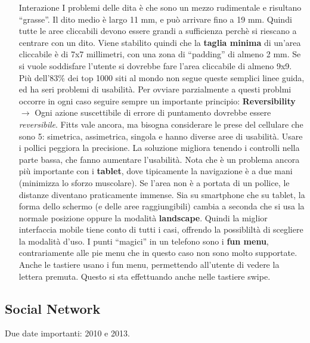 \begin{enumerate}
\item[Interazione] I problemi delle dita \`e che sono un mezzo rudimentale e risultano ``grasse''. Il dito medio \`e largo 11 mm, e pu\`o arrivare fino a 19 mm. Quindi tutte le aree cliccabili devono essere grandi a sufficienza perch\`e si riescano a centrare con un dito. Viene stabilito quindi che la \textbf{taglia minima} di un'area cliccabile \`e di 7x7 millimetri, con una zona di ``padding'' di almeno 2 mm. Se si vuole soddisfare l'utente si dovrebbe fare l'area cliccabile di almeno 9x9. Pi\`u dell'83\% dei top 1000 siti al mondo non segue queste semplici linee guida, ed ha seri problemi di usabilit\`a. Per ovviare parzialmente a questi problmi occorre in ogni caso seguire sempre un importante principio: \textbf{Reversibility} $\to$ Ogni azione suscettibile di errore di puntamento dovrebbe essere \textit{reversibile}.
  Fitts vale ancora, ma bisogna considerare le prese del cellulare che sono 5: simetrica, assimetrica, singola e hanno diverse aree di usabilit\`a. Usare i pollici peggiora la precisione. La soluzione migliora tenendo i controlli nella parte bassa, che fanno aumentare l'usabilit\`a. Nota che \`e un problema ancora pi\`u importante con i \textbf{tablet}, dove tipicamente la navigazione \`e a due mani (minimizza lo sforzo muscolare). Se l'area non \`e a portata di un pollice, le distanze diventano praticamente immense. Sia su smartphone che su tablet, la forma dello schermo (e delle aree raggiungibili) cambia a seconda che si usa la normale posizione oppure la modalit\`a \textbf{landscape}. Quindi la miglior interfaccia mobile tiene conto di tutti i casi, offrendo la possiblilt\`a di scegliere la modalit\`a d'uso. I punti ``magici'' in un telefono sono i \textbf{fun menu}, contrariamente alle pie menu che in questo caso non sono molto supportate. Anche le tastiere usano i fun menu, permettendo all'utente di vedere la lettera premuta. Questo si sta effettuando anche nelle tastiere swipe.

\end{enumerate}

\subsection{Social Network}

Due date importanti: 2010 e 2013.


